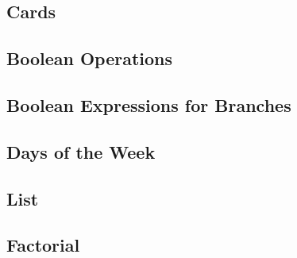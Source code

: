
\subsection{Cards} \label{cards}


\newpage
\subsection{Boolean Operations} \label{bool_ops}


\newpage
\subsection{Boolean Expressions for Branches} \label{bool_expr}


\newpage
\subsection{Days of the Week} \label{days}


\newpage
\subsection{List} \label{list}


\newpage
\subsection{Factorial} \label{factorial}










